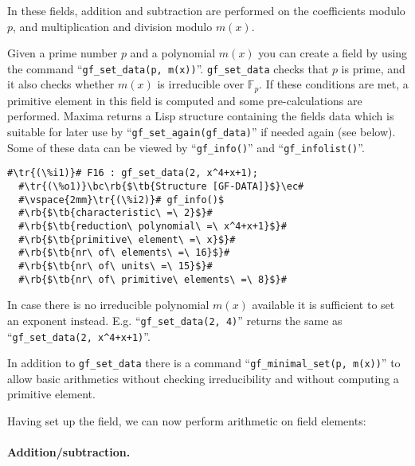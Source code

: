 \documentclass[a4paper,11pt,leqno,fleqn]{artikel3}
\newcommand{\bc}{\begin{center}}
\newcommand{\ec}{\end{center}}
\newcommand{\tr}[1]{\textcolor{red}{#1}}
\newcommand{\tb}[1]{\textcolor{blue}{#1}}
\newcommand{\rb}[1]{\raisebox{2mm}[0mm][1mm]{#1}}
\begin{document}
In these fields, addition and subtraction are performed on the coefficients
modulo $p$, and multiplication and division modulo $m(x)$.

Given a prime number $p$ and a polynomial $m(x)$ 
you can create a field by using the command ``\verb!gf_set_data(p, m(x))!''.
\verb!gf_set_data! checks that $p$ is prime, and it also checks 
whether $m(x)$ is irreducible over $\mathbb{F}_p$. If these conditions are met, 
a primitive element in this field is computed and some pre-calculations are performed.
Maxima returns a Lisp structure containing the fields data which is 
suitable for later use by ``\verb!gf_set_again(gf_data)!'' if needed again (see below).
Some of these data can be viewed by ``\verb!gf_info()!'' and ``\verb!gf_infolist()!''.

%
\vspace*{2mm}
\begin{lstlisting}[escapechar=\#]
  #\tr{(\%i1)}# F16 : gf_set_data(2, x^4+x+1);
  #\tr{(\%o1)}\bc\rb{$\tb{Structure [GF-DATA]}$}\ec#
  #\vspace{2mm}\tr{(\%i2)}# gf_info()$
  #\rb{$\tb{characteristic\ =\ 2}$}#
  #\rb{$\tb{reduction\ polynomial\ =\ x^4+x+1}$}#
  #\rb{$\tb{primitive\ element\ =\ x}$}#
  #\rb{$\tb{nr\ of\ elements\ =\ 16}$}#
  #\rb{$\tb{nr\ of\ units\ =\ 15}$}#
  #\rb{$\tb{nr\ of\ primitive\ elements\ =\ 8}$}#
\end{lstlisting}

In case there is no irreducible polynomial $m(x)$ available 
it is sufficient to set an exponent instead. 
E.g. ``\verb!gf_set_data(2, 4)!'' returns the same as ``\verb!gf_set_data(2, x^4+x+1)!''.

In addition to \verb!gf_set_data! there is a command ``\verb!gf_minimal_set(p, m(x))!'' 
to allow basic arithmetics without checking irreducibility and 
without computing a primitive element.


\bigskip

Having set up the field, we can now perform arithmetic on field elements:


\paragraph{Addition/subtraction.}
\end{document}
